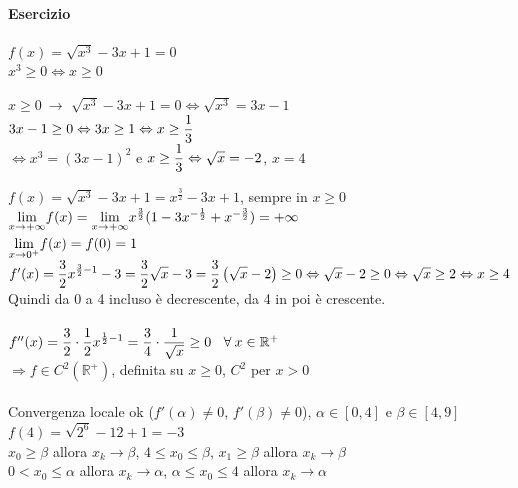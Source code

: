 \documentclass[10pt]{book}
\begin{document}
\paragraph{Esercizio} $f(x) = \sqrt{x^3} - 3x + 1 = 0$\\
$x^3 \geq 0 \Leftrightarrow x \geq 0$
\begin{list}{}{}
	\item[$x\geq0\:\rightarrow$] $\sqrt{x^3} - 3x + 1 = 0 \Leftrightarrow \sqrt{x^3} = 3x - 1$\\
	$3x - 1 \geq 0 \Leftrightarrow 3x \geq 1 \Leftrightarrow x \geq \mathlarger{\frac{1}{3}}$\\
	$\Leftrightarrow x^3 = (3x - 1)^2$ e $x \geq \mathlarger{\frac{1}{3}} \Leftrightarrow \sqrt{x} = -2$, $x = 4$
\end{list}
$f(x) = \sqrt{x^3} - 3x + 1 = x^{\frac{3}{2}} - 3x + 1$, sempre in $x\geq 0$\\
$\mathlarger{\lim_{x\to+\infty}} f(x) = \mathlarger{\lim_{x\to+\infty}}x^{\frac{3}{2}}(1 - 3x^{-\frac{1}{2}} + x^{-\frac{3}{2}}) = +\infty$\\
$\mathlarger{\lim_{x\to 0^+}} f(x) = f(0) = 1$\\
$f'(x) = \mathlarger{\frac{3}{2}x^{\frac{3}{2} - 1} - 3} = \mathlarger{\frac{3}{2}\sqrt{x} - 3} = \mathlarger{\frac{3}{2}\left(\sqrt{x} - 2 \right)} \geq 0 \Leftrightarrow \sqrt{x} - 2 \geq 0 \Leftrightarrow \sqrt{x} \geq 2 \Leftrightarrow x \geq 4$\\
Quindi da 0 a 4 incluso è decrescente, da 4 in poi è crescente.\\\\
$f''(x) = \mathlarger{\frac{3}{2}\cdot\frac{1}{2} x^{\frac{1}{2} - 1}} = \mathlarger{\frac{3}{4}\cdot\frac{1}{\sqrt{x}}} \geq 0\:\:\:\:\forall\:x\in\mathbb{R}^+$\\
$\Rightarrow f\in C^2(\mathbb{R}^+)$, definita su $x\geq 0$, $C^2$ per $x > 0$\\\\
Convergenza locale ok ($f'(\alpha) \neq 0$, $f'(\beta) \neq 0$), $\alpha\in[0, 4]$ e $\beta\in[4, 9]$\\
$f(4) = \sqrt{2^6} - 12 + 1 = -3$\\
$x_0 \geq \beta$ allora $x_k \longrightarrow \beta$, $4 \leq x_0 \leq \beta$, $x_1 \geq \beta$ allora $x_k \longrightarrow \beta$\\
$0 < x_0 \leq \alpha$ allora $x_k \longrightarrow \alpha$, $\alpha \leq x_0 \leq 4$ allora $x_k \longrightarrow \alpha$
\pagebreak
\end{document}
